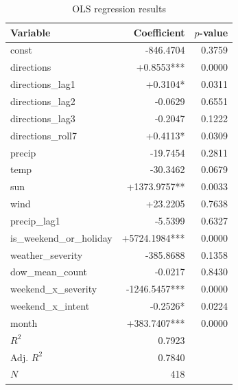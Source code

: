 \begin{table}[htbp]
\centering
\caption{OLS regression results}
\label{tab:ols}
\begin{tabular}{lrr}
\toprule
Variable & Coefficient & $p$-value \\
\midrule
  const & -846.4704 & 0.3759 \\
  directions & +0.8553*** & 0.0000 \\
  directions\_lag1 & +0.3104* & 0.0311 \\
  directions\_lag2 & -0.0629 & 0.6551 \\
  directions\_lag3 & -0.2047 & 0.1222 \\
  directions\_roll7 & +0.4113* & 0.0309 \\
  precip & -19.7454 & 0.2811 \\
  temp & -30.3462 & 0.0679 \\
  sun & +1373.9757** & 0.0033 \\
  wind & +23.2205 & 0.7638 \\
  precip\_lag1 & -5.5399 & 0.6327 \\
  is\_weekend\_or\_holiday & +5724.1984*** & 0.0000 \\
  weather\_severity & -385.8688 & 0.1358 \\
  dow\_mean\_count & -0.0217 & 0.8430 \\
  weekend\_x\_severity & -1246.5457*** & 0.0000 \\
  weekend\_x\_intent & -0.2526* & 0.0224 \\
  month & +383.7407*** & 0.0000 \\
\midrule
  $R^2$ & 0.7923 & \\
  Adj. $R^2$ & 0.7840 & \\
  $N$ & 418 & \\
\bottomrule
\end{tabular}
\end{table}